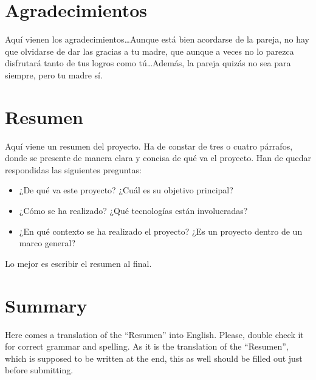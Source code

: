 \documentclass[a4paper, 12pt]{book}
\begin{document}
\chapter*{Agradecimientos}

Aquí vienen los agradecimientos\ldots Aunque está bien acordarse de la pareja,
no hay que olvidarse de dar las gracias a tu madre, que aunque a veces no lo 
parezca disfrutará tanto de tus logros como tú\ldots Además, la pareja quizás
no sea para siempre, pero tu madre sí.


\chapter*{Resumen}

Aquí viene un resumen del proyecto. Ha de constar de tres o cuatro párrafos,
donde se presente de manera clara y concisa de qué va el proyecto. Han
de quedar respondidas las siguientes preguntas:

\begin{itemize}
  \item ¿De qué va este proyecto? ¿Cuál es su objetivo principal?
  \item ¿Cómo se ha realizado? ¿Qué tecnologías están involucradas?
  \item ¿En qué contexto se ha realizado el proyecto? ¿Es un proyecto
dentro de un marco general?
\end{itemize}

Lo mejor es escribir el resumen al final.


\chapter*{Summary}

Here comes a translation of the ``Resumen'' into English. Please, double check
it for correct grammar and spelling. As it is the translation of the ``Resumen'',
which is supposed to be written at the end, this as well should be filled out
just before submitting.
\end{document}
